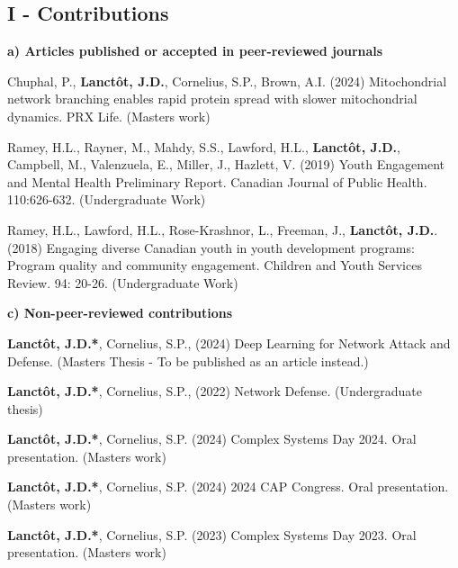 \begin{contributions}
\section*{I - Contributions}
\vspace{-1.5em}
\textbf{a) Articles published or accepted in peer-reviewed journals}

\vspace{-0.6em}
Chuphal, P., \textbf{Lanct\^{o}t, J.D.}, Cornelius, S.P., Brown, A.I. (2024) Mitochondrial network branching enables rapid protein spread with slower mitochondrial dynamics. PRX Life. (Masters work)

Ramey, H.L., Rayner, M., Mahdy, S.S.,  Lawford, H.L., \textbf{Lanct\^{o}t, J.D.}, Campbell, M., Valenzuela, E., Miller, J., Hazlett, V. (2019) Youth Engagement and Mental Health Preliminary Report. Canadian Journal of Public Health. 110:626-632. (Undergraduate Work)

Ramey, H.L.,  Lawford, H.L., Rose-Krashnor, L., Freeman, J., \textbf{Lanct\^{o}t, J.D.}. (2018) Engaging diverse Canadian youth in youth development programs: Program quality and community engagement. Children and Youth Services Review. 94: 20-26.  (Undergraduate Work)


\textbf{c) Non-peer-reviewed contributions}

\vspace{-0.6em}
\textbf{Lanct\^{o}t, J.D.*}, Cornelius, S.P., (2024) Deep Learning for Network Attack and Defense. (Masters Thesis - To be published as an article instead.)

\textbf{Lanct\^{o}t, J.D.*}, Cornelius, S.P., (2022) Network Defense. (Undergraduate thesis)

\textbf{Lanct\^{o}t, J.D.*}, Cornelius, S.P. (2024) Complex Systems Day 2024. Oral presentation. (Masters work)

\textbf{Lanct\^{o}t, J.D.*}, Cornelius, S.P. (2024) 2024 CAP Congress. Oral presentation. (Masters work)

\textbf{Lanct\^{o}t, J.D.*}, Cornelius, S.P. (2023) Complex Systems Day 2023. Oral presentation. (Masters work)


\end{contributions}
